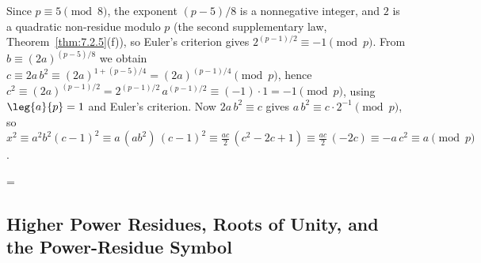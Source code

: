 \documentclass[11pt]{article}
\makeatletter
\theoremstyle{ntstyle}
\let\nt@closedisplay\]
\def\nt@guardedclose{\@ifnextchar\par{\nt@closeafterpar}{\@ifnextchar\end{\postdisplaypenalty\@M\nt@closedisplay}{\nt@closedisplay}}}
\def\nt@closeafterpar\par{\@ifnextchar\par{\nt@closeafterpar}{\@ifnextchar\end{\postdisplaypenalty\@M\nt@closedisplay\par}{\nt@closedisplay\par}}}
\renewenvironment{proof}[1][\proofname]{\par
  \pushQED{\qed}\normalfont\topsep\medskipamount\edef\nt@afterproof{\@endparpenalty=\the\@endparpenalty\relax}\@beginparpenalty\@M\@endparpenalty\@M\let\]\nt@guardedclose\trivlist\item[]\textit{#1\@addpunct{.}} \ignorespaces}{\ifvmode\addpenalty\@M\fi\popQED\nt@afterproof\endtrivlist\@endpefalse}
\makeatother
\begin{document}
\begin{proof} Since $p \equiv 5 \pmod{8}$, the exponent
	$(p-5)/8$ is a nonnegative integer, and $2$ is a quadratic
	non-residue modulo $p$ (the second supplementary law, Theorem~\ref{thm:7.2.5}(f)), so Euler's
	criterion gives $2^{(p-1)/2} \equiv -1 \pmod{p}$. From $b \equiv
		(2a)^{(p-5)/8}$ we obtain $c \equiv 2a\,b^2 \equiv (2a)^{1 + (p-5)/4}
		= (2a)^{(p-1)/4} \pmod{p}$, hence $c^2 \equiv (2a)^{(p-1)/2} =
		2^{(p-1)/2}\,a^{(p-1)/2} \equiv (-1)\cdot 1 = -1 \pmod{p}$, using
	$\leg{a}{p} = 1$ and Euler's criterion. Now $2a\,b^2
		\equiv c$ gives $a\,b^2 \equiv c\cdot 2^{-1} \pmod{p}$, so $x^2 \equiv
		a^2 b^2 (c-1)^2 \equiv a\,(a b^2)\,(c-1)^2 \equiv \tfrac{a
			c}{2}\,(c^2 - 2c + 1) \equiv \tfrac{a c}{2}\,(-2c) \equiv -a\,c^2
		\equiv a \pmod{p}$.

\end{proof}
\subsection{Higher Power Residues, Roots of Unity, and the Power-Residue Symbol}
\end{document}
